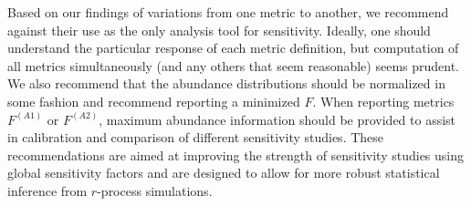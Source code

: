 \documentclass[aps,prc,reprint,showpacs,floatfix,nofootinbib]{revtex4-1}
\begin{document}
Based on our findings of variations from one metric to another, we recommend against their use as the only analysis tool for sensitivity. Ideally, one should understand the particular response of each metric definition,
 but computation of all metrics simultaneously (and any others that seem reasonable) seems prudent. We also recommend that the abundance distributions should be normalized in some fashion and 
 recommend reporting a minimized $F$. When reporting metrics $F^{(A1)}$ or $F^{(A2)}$, maximum abundance information should be provided to assist 
in calibration and comparison of different sensitivity studies. These recommendations are aimed at improving the strength of sensitivity studies using global sensitivity factors 
and are designed to allow for more robust statistical inference from $r$-process simulations. 


\end{document}
